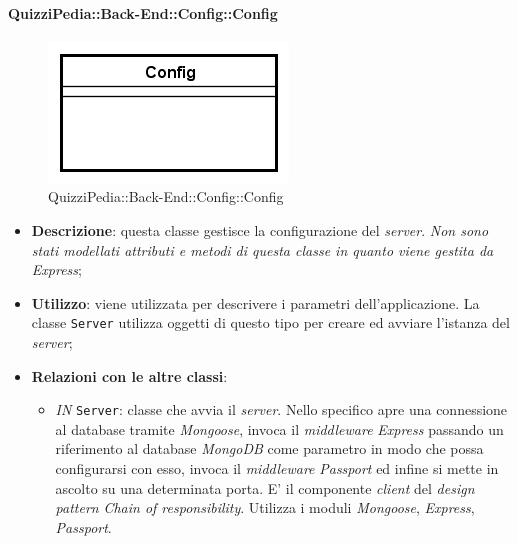 \paragraph{QuizziPedia::Back-End::Config::Config}
\label{QuizziPedia::Back-End::Config::Config}
\begin{figure}[ht]
	\centering
	\includegraphics[scale=0.45]{UML/Classi/Back-End/QuizziPedia_Back-End_Config_Config.png}
	\caption{QuizziPedia::Back-End::Config::Config}
	\end{figure}
\FloatBarrier
	\begin{itemize}
		\item \textbf{Descrizione}:
		questa classe gestisce la configurazione del \textit{server}. \textit{Non sono stati modellati attributi e metodi di questa classe in quanto viene gestita da Express};
		\item \textbf{Utilizzo}:
		viene utilizzata per descrivere i parametri dell'applicazione. La classe \texttt{Server} utilizza oggetti di questo tipo per creare ed avviare l'istanza del \textit{server};
		\item \textbf{Relazioni con le altre classi}:
		 \begin{itemize}
		 	\item \textit{IN} \texttt{Server}:
		 	classe che avvia il \textit{server}. Nello specifico apre una connessione al database tramite \textit{Mongoose}, invoca il \textit{middleware} \textit{Express} passando un riferimento al database \textit{MongoDB} come parametro in modo  che possa configurarsi con esso, invoca il \textit{middleware} \textit{Passport} ed infine si mette in ascolto su una determinata porta. E' il componente \textit{client} del \textit{design pattern} \textit{Chain of responsibility}. Utilizza i moduli \textit{Mongoose}, \textit{Express}, \textit{Passport}.
		 \end{itemize}
	\end{itemize}
